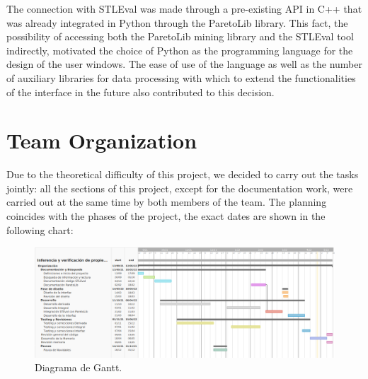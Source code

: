 The connection with STLEval was made through a pre-existing API in C++ that was already integrated in Python through the ParetoLib library. This fact, the possibility of accessing both the ParetoLib mining library and the STLEval tool indirectly, motivated the choice of Python as the programming language for the design of the user windows. The ease of use of the language as well as the number of auxiliary libraries for data processing with which to extend the functionalities of the interface in the future also contributed to this decision.

\section{Team Organization}
Due to the theoretical difficulty of this project, we decided to carry out the tasks jointly: all the sections of this project, except for the documentation work, were carried out at the same time by both members of the team.
The planning coincides with the phases of the project, the exact dates are shown in the following chart:

\begin{figure}
\centering
  \includegraphics[width=.9\linewidth ,angle = 90,scale = 1.2]{images/gant}
\caption{Diagrama de Gantt.}
\label{fig:gant}
\end{figure}